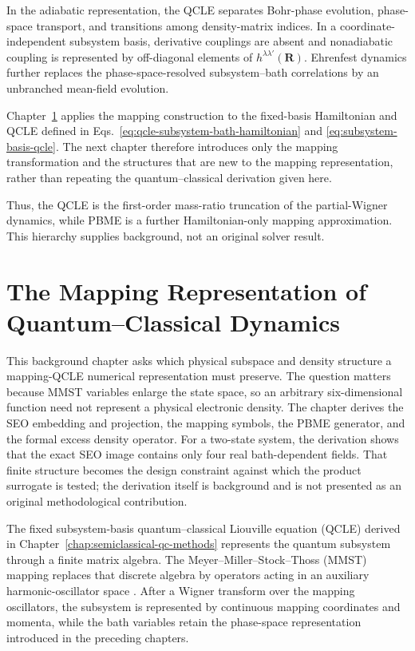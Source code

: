 \documentclass[
  11pt,
  letterpaper,
  onehalfspacing,
  normalmargins,
  equalmargins,
  oneside
]{ut-thesis}
\begin{document}
In the adiabatic representation, the QCLE separates Bohr-phase evolution,
phase-space transport, and transitions among density-matrix indices. In a
coordinate-independent subsystem basis, derivative couplings are absent and
nonadiabatic coupling is represented by off-diagonal elements of
\(h^{\lambda\lambda'}(\mathbf R)\). Ehrenfest dynamics further replaces the
phase-space-resolved subsystem--bath correlations by an unbranched mean-field
evolution.

Chapter~\ref{chap:mapping-representation} applies the mapping construction to
the fixed-basis Hamiltonian and QCLE defined in
Eqs.~\eqref{eq:qcle-subsystem-bath-hamiltonian} and
\eqref{eq:subsystem-basis-qcle}. The next chapter therefore introduces only
the mapping transformation and the structures that are new to the mapping
representation, rather than repeating the quantum--classical derivation given
here.

Thus, the QCLE is the first-order mass-ratio truncation of the partial-Wigner
dynamics, while PBME is a further Hamiltonian-only mapping approximation.
This hierarchy supplies background, not an original solver result.

\chapter{The Mapping Representation of Quantum--Classical Dynamics}
\label{chap:mapping-representation}

This background chapter asks which physical subspace and density structure a
mapping-QCLE numerical representation must preserve.  The question matters
because MMST variables enlarge the state space, so an arbitrary
six-dimensional function need not represent a physical electronic density.
The chapter derives the SEO embedding and projection, the mapping symbols, the
PBME generator, and the formal excess density operator.  For a two-state
system, the derivation shows that the exact SEO image contains only four real
bath-dependent fields.  That finite structure becomes the design constraint
against which the product surrogate is tested; the derivation itself is
background and is not presented as an original methodological contribution.

The fixed subsystem-basis quantum--classical Liouville equation (QCLE)
derived in Chapter~\ref{chap:semiclassical-qc-methods} represents the quantum
subsystem through a finite matrix algebra. The
Meyer--Miller--Stock--Thoss (MMST) mapping replaces that discrete algebra by
operators acting in an auxiliary harmonic-oscillator space
\cite{MeyerMiller1979JCP,StockThoss1997PRL,ThossStock1999PRA,
StockThoss2005,RunesonRichardson2019,RunesonRichardson2020}. After a Wigner
transform over the mapping oscillators, the subsystem is represented by
continuous mapping coordinates and momenta, while the bath variables retain
the phase-space representation introduced in the preceding chapters.
\end{document}
